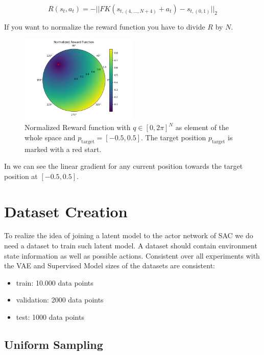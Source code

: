 \begin{equation}\label{eqn:Rewardfunction}
    R(s_t, a_t) = - ||FK(s_{t, (4, \ldots, N + 4)}  + a_t) - s_{t, (0 ,1)}||_2
\end{equation}

If you want to normalize the reward function you have to divide $R$ by $N$.

\begin{figure}[h]
	\centering
	\includegraphics[width=0.5\textwidth,]{figures/methodology/RewardFunction.png}
	\caption[Reward function]{Normalized Reward function with $q \in [0, 2\pi]^N$ as element of the whole space and $p_\text{target} = [-0.5, 0.5]$. The target position $p_\text{target}$ is marked with a red start.}
	\label{fig:Reward_function}
\end{figure}

In  we can see the linear gradient for any current position towards the target position at $[-0.5, 0.5]$.

\section{Dataset Creation}\label{sec:Dataset_creation}

To realize the idea of joining a latent model to the actor network of SAC we do need a dataset to train such latent model. A dataset should contain environment state information as well as possible actions.
Consistent over all experiments with the VAE and Supervised Model sizes of the datasets are consistent:
\begin{itemize}
    \item train: 10.000 data points
    \item validation: 2000 data points
    \item test: 1000 data points
\end{itemize}

\subsection{Uniform Sampling} \label{sec:vanilla_sampling}

